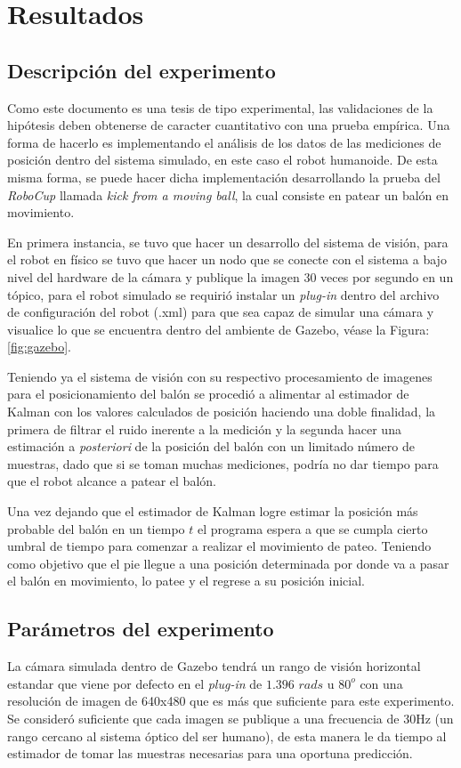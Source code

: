 \chapter{Resultados}
\section{Descripción del experimento}
	Como este documento es una tesis de tipo experimental, las validaciones de la hipótesis deben obtenerse de caracter cuantitativo con una prueba empírica. Una forma de hacerlo es implementando el análisis de los datos de las mediciones de posición dentro del sistema simulado, en este caso el robot humanoide. De esta misma forma, se puede hacer dicha implementación desarrollando la prueba del \textit{RoboCup} llamada \textit{kick from a moving ball}, la cual consiste en patear un balón en movimiento.

	En primera instancia, se tuvo que hacer un desarrollo del sistema de visión, para el robot en físico se tuvo que hacer un nodo que se conecte con el sistema a bajo nivel del hardware de la cámara y publique la imagen 30 veces por segundo en un tópico, para el robot simulado se requirió instalar un \textit{plug-in} dentro del archivo de configuración del robot (.xml) para que sea capaz de simular una cámara y visualice lo que se encuentra dentro del ambiente de Gazebo, véase la Figura: \ref{fig:gazebo}.

	Teniendo ya el sistema de visión con su respectivo procesamiento de imagenes para el posicionamiento del balón se procedió a alimentar al estimador de Kalman con los valores calculados de posición haciendo una doble finalidad, la primera de filtrar el ruido inerente a la medición y la segunda hacer una estimación a \textit{posteriori} de la posición del balón con un limitado número de muestras, dado que si se toman muchas mediciones, podría no dar tiempo para que el robot alcance a patear el balón.
	
	Una vez dejando que el estimador de Kalman logre estimar la posición más probable del balón en un tiempo $t$ el programa espera a que se cumpla cierto umbral de tiempo para comenzar a realizar el movimiento de pateo. Teniendo como objetivo que el pie llegue a una posición determinada por donde va a pasar el balón en movimiento, lo patee y el regrese a su posición inicial.	
\section{Parámetros del experimento}
	La cámara simulada dentro de Gazebo tendrá un rango de visión horizontal estandar que viene por defecto en el \textit{plug-in} de $1.396$ $ rads$ u $80^o$ con una resolución de imagen de 640x480 que es más que suficiente para este experimento. Se consideró suficiente que cada imagen se publique a una frecuencia de 30Hz (un rango cercano al sistema óptico del ser humano), de esta manera le da tiempo al estimador de tomar las muestras necesarias para una oportuna predicción.

